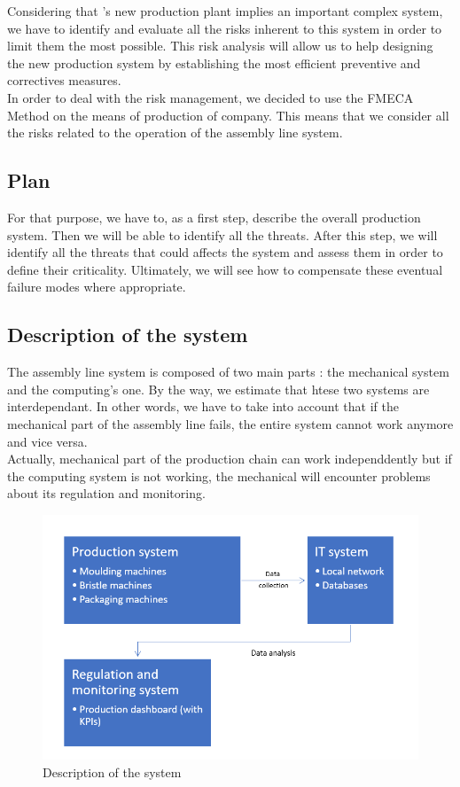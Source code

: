 Considering that \moldco 's new production plant implies an important complex system, we have to identify and evaluate all the risks inherent to this system in order to limit them the most possible. This risk analysis will allow us to help designing the new production system by establishing the most efficient preventive and correctives measures.\\

In order to deal with the risk management, we decided to use the FMECA Method on the means of production of \moldco company. This means that we consider all the risks related to the operation of the assembly line system.\\

\subsection{Plan}

For that purpose, we have to, as a first step, describe the overall production system. Then we will be able to identify all the threats. After this step, we will identify all the threats that could affects the system and assess them in order to define their criticality.
Ultimately, we will see how to compensate these eventual failure modes where appropriate.\\

\subsection{Description of the system}

The assembly line system is composed of two main parts : the mechanical system and the computing's one.
By the way, we estimate that htese two systems are interdependant. In other words, we have to take into account that if the mechanical part of the assembly line fails, the entire system cannot work anymore and vice versa.\\
Actually, mechanical part of the production chain can work independdently but if the computing system is not working, the mechanical will encounter problems about its regulation and monitoring.\\

\begin{figure}[h]
    \centering
    \includegraphics{Img/description-system.png}
    \caption{Description of the system}
\end{figure}

